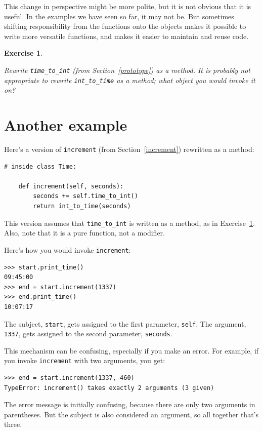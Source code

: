 \documentclass[12pt,a4paper,final,twoside,onecolumn,titlepage]{book}
\newtheorem{exercise}{Exercise}[chapter]
\begin{document}
This change in perspective might be more polite, but it is not obvious
that it is useful.  In the examples we have seen so far, it may not
be.  But sometimes shifting responsibility from the functions onto the
objects makes it possible to write more versatile functions, and makes
it easier to maintain and reuse code.

\begin{exercise}
\label{convert}

Rewrite \verb"time_to_int" (from Section~\ref{prototype}) as a method.
It is probably not appropriate to rewrite \verb"int_to_time" as a
method; what object you would invoke it on?

\end{exercise}


\section{Another example}

Here's a version of {\tt increment} (from Section~\ref{increment})
rewritten as a method:

\begin{verbatim}
# inside class Time:

    def increment(self, seconds):
        seconds += self.time_to_int()
        return int_to_time(seconds)
\end{verbatim}
%
This version assumes that \verb"time_to_int" is written
as a method, as in Exercise~\ref{convert}.  Also, note that
it is a pure function, not a modifier.

Here's how you would invoke {\tt increment}:

\begin{verbatim}
>>> start.print_time()
09:45:00
>>> end = start.increment(1337)
>>> end.print_time()
10:07:17
\end{verbatim}
%
The subject, {\tt start}, gets assigned to the first parameter,
{\tt self}.  The argument, {\tt 1337}, gets assigned to the
second parameter, {\tt seconds}.

This mechanism can be confusing, especially if you make an error.
For example, if you invoke {\tt increment} with two arguments, you
get:

\begin{verbatim}
>>> end = start.increment(1337, 460)
TypeError: increment() takes exactly 2 arguments (3 given)
\end{verbatim}
%
The error message is initially confusing, because there are
only two arguments in parentheses.  But the subject is also
considered an argument, so all together that's three.
\end{document}
